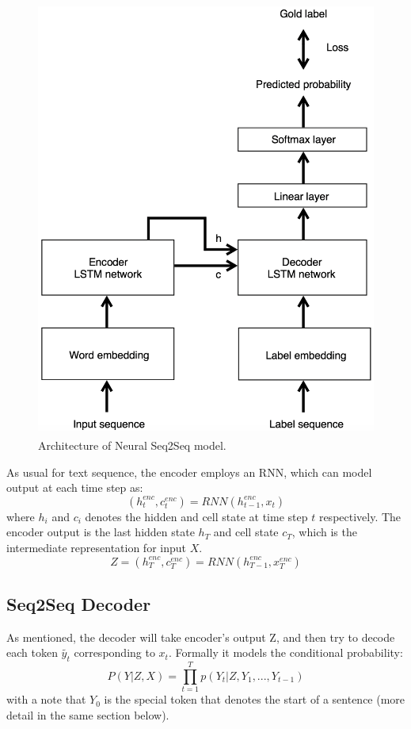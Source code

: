 \documentclass[11pt,a4paper]{article}
\begin{document}
\begin{figure}[ht]
\centering
\includegraphics[width=0.7\linewidth]{fig_architecture}
\caption{Architecture of Neural Seq2Seq model.}
\label{fig:fig_architecture}
\end{figure}
As usual for text sequence, the encoder employs an RNN, which can model output at each time step as: 
  \begin{equation}
	({h^{enc}_t}, {c^{enc}_t}) = RNN(h^{enc}_{t-1}, x_t)
  \end{equation}
where $h_i$ and $c_i$ denotes the hidden and cell state at time step $t$ respectively. The encoder output is the last hidden state $h_T$ and cell state $c_T$, which is the intermediate representation for input $X$. 
  \begin{equation}
      {Z} = ({h^{enc}_T}, {c^{enc}_T}) = RNN(h^{enc}_{T-1}, x^{enc}_T)	
  \end{equation}

\subsection{Seq2Seq Decoder}
As mentioned, the decoder will take encoder's output Z, and then try to decode each token $\tilde{y_t}$ corresponding to $x_t$. Formally it models the conditional probability: 
  \begin{equation}
      P(Y|Z,X) = \prod_{t=1}^{T} p(Y_t|{Z}, Y_1, ..., Y_{t-1})
  \end{equation}
with a note that $Y_0$ is the special token that denotes the start of a sentence (more detail in the same section below). 
\end{document}
